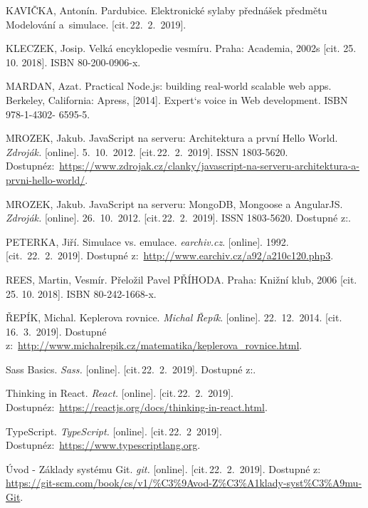 \documentclass[a4paper,12pt]{article}
\begin{document}
\begin{thebibliography}{99}
KAVIČKA, Antonín. Pardubice. Elektronické sylaby přednášek předmětu Modelování a~simulace. [cit.\,22.~2.~2019].

KLECZEK, Josip. Velká encyklopedie vesmíru. Praha: Academia, 2002s [cit. 25. 10. 2018]. ISBN 80-200-0906-x.

MARDAN, Azat. Practical Node.js: building real-world scalable web apps. Berkeley, California: Apress, [2014]. Expert‘s voice in Web development. ISBN 978-1-4302- 6595-5.

MROZEK, Jakub. JavaScript na serveru: Architektura a první Hello World.
\textit{Zdroják.} [online]. 5.~10.~2012. [cit.\,22.~2.~2019].  ISSN 1803-5620.
Dostupné\newline z:~{\ttfamily \url{https://www.zdrojak.cz/clanky/javascript-na-serveru-architektura-a-prvni-hello-world/}}.

MROZEK, Jakub. JavaScript na serveru: MongoDB, Mongoose a AngularJS.
\textit{Zdroják.} [online]. 26.~10.~2012. [cit.\,22.~2.~2019]. ISSN 1803-5620.
Dostupné z:.

PETERKA, Jiří. Simulace vs. emulace. \textit{earchiv.cz}. [online]. 1992. [cit.~22.~2.~2019]. Dostupné z:~{\ttfamily\url{http://www.earchiv.cz/a92/a210c120.php3}}.

REES, Martin, Vesmír. Přeložil Pavel PŘÍHODA. Praha: Knižní klub, 2006 [cit. 25. 10. 2018]. ISBN 80-242-1668-x.

ŘEPÍK, Michal. Keplerova rovnice. \textit{Michal Řepík}. [online]. 22.~12.~2014. [cit. 16.~3.~2019]. Dostupné z:~{\ttfamily\url{http://www.michalrepik.cz/matematika/keplerova_rovnice.html}}.

Sass Basics.
\textit{Sass.} [online]. [cit.\,22.~2.~2019].
Dostupné z:.

Thinking in React.
\textit{React.} [online]. [cit.\,22.~2.~2019]. 
Dostupné\newline z:~{\ttfamily \url{https://reactjs.org/docs/thinking-in-react.html}}.

TypeScript. 
\textit{TypeScript.} [online]. [cit.\,22.~2~2019]. 
Dostupné\newline z:~{\ttfamily \url{https://www.typescriptlang.org}}.

Úvod - Základy systému Git.
\textit{git.} [online]. [cit.\,22.~2.~2019]. 
Dostupné z: {\ttfamily \url{https://git-scm.com/book/cs/v1/%C3%9Avod-Z%C3%A1klady-syst%C3%A9mu-Git}}.



\end{thebibliography}
\end{document}
